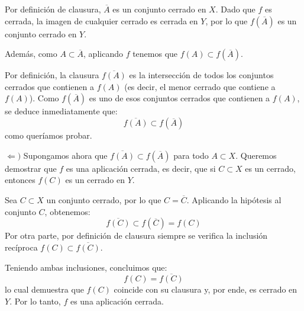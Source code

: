 \begin{ejer}
\begin{itemize}
\begin{sol}
    Por definición de clausura, $\overline{A}$ es un conjunto cerrado en $X$. Dado que $f$ es cerrada, la imagen de cualquier cerrado es cerrada en $Y$, por lo que $f(\overline{A})$ es un conjunto cerrado en $Y$.
    
    Además, como $A \subset \overline{A}$, aplicando $f$ tenemos que $f(A) \subset f(\overline{A})$.
    
    Por definición, la clausura $\overline{f(A)}$ es la intersección de todos los conjuntos cerrados que contienen a $f(A)$ (es decir, el menor cerrado que contiene a $f(A)$). Como $f(\overline{A})$ es uno de esos conjuntos cerrados que contienen a $f(A)$, se deduce inmediatamente que:
    \[
        \overline{f(A)} \subset f(\overline{A})
    \]
    como queríamos probar.

    \medskip

    $\Leftarrow)$ Supongamos ahora que $\overline{f(A)} \subset f(\overline{A})$ para todo $A \subset X$. Queremos demostrar que $f$ es una aplicación cerrada, es decir, que si $C \subset X$ es un cerrado, entonces $f(C)$ es un cerrado en $Y$.
    
    Sea $C \subset X$ un conjunto cerrado, por lo que $C = \overline{C}$. Aplicando la hipótesis al conjunto $C$, obtenemos:
    \[
        \overline{f(C)} \subset f(\overline{C}) = f(C)
    \]
    Por otra parte, por definición de clausura siempre se verifica la inclusión recíproca $f(C) \subset \overline{f(C)}$.
    
    Teniendo ambas inclusiones, concluimos que:
    \[
        f(C) = \overline{f(C)}
    \]
    lo cual demuestra que $f(C)$ coincide con su clausura y, por ende, es cerrado en $Y$. Por lo tanto, $f$ es una aplicación cerrada.
\end{sol}
    \end{itemize}
\end{ejer}
